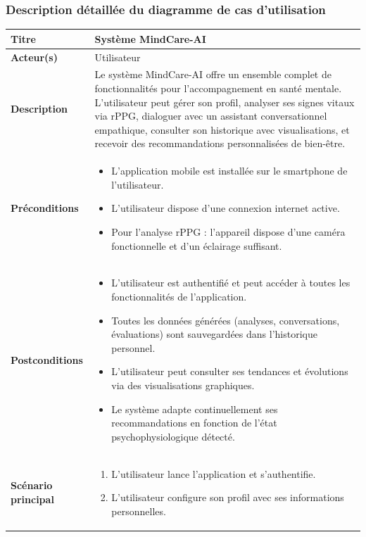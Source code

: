 \subsubsection*{Description détaillée du diagramme de cas d'utilisation}

\begin{table}[H]
\centering
\small
\begin{tabularx}{\linewidth}{|p{4cm}|X|}
\hline
\textbf{Titre} & Système MindCare-AI \\
\hline
\textbf{Acteur(s)} & Utilisateur \\
\hline
\textbf{Description} & 
Le système MindCare-AI offre un ensemble complet de fonctionnalités pour l'accompagnement en santé mentale. L'utilisateur peut gérer son profil, analyser ses signes vitaux via rPPG, dialoguer avec un assistant conversationnel empathique, consulter son historique avec visualisations, et recevoir des recommandations personnalisées de bien-être. \\
\hline
\textbf{Préconditions} & 
\begin{itemize}
    \item L'application mobile est installée sur le smartphone de l'utilisateur.
    \item L'utilisateur dispose d'une connexion internet active.
    \item Pour l'analyse rPPG : l'appareil dispose d'une caméra fonctionnelle et d'un éclairage suffisant.
\end{itemize} \\
\hline
\textbf{Postconditions} & 
\begin{itemize}
    \item L'utilisateur est authentifié et peut accéder à toutes les fonctionnalités de l'application.
    \item Toutes les données générées (analyses, conversations, évaluations) sont sauvegardées dans l'historique personnel.
    \item L'utilisateur peut consulter ses tendances et évolutions via des visualisations graphiques.
    \item Le système adapte continuellement ses recommandations en fonction de l'état psychophysiologique détecté.
\end{itemize} \\
\hline
\textbf{Scénario principal} & 
\begin{enumerate}
    \item L'utilisateur lance l'application et s'authentifie.
    \item L'utilisateur configure son profil avec ses informations personnelles.

\end{enumerate}
\end{tabularx}
\end{table}
